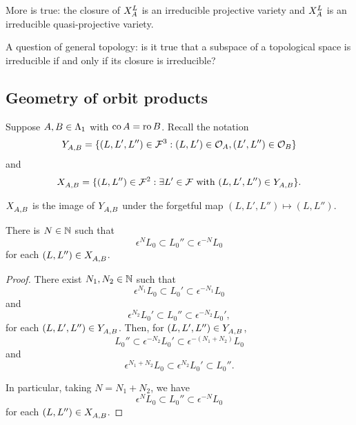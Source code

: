 \documentclass[a4paper, 11pt]{report}
\begin{document}
\begin{remark}
More is true: the closure of $\xprod[L]{A}$ is an irreducible projective variety and $\xprod[L]{A}$ is an irreducible quasi-projective variety.
\end{remark}

\begin{remark}
A question of general topology: is it true that a subspace of a topological space is irreducible if and only if its closure is irreducible?
\end{remark}


\subsection{Geometry of orbit products}

Suppose $A,B\in\matrices$ with $\co{A}=\ro{B}$. Recall the notation
\begin{equation*}
\yprod{A,B} = \{(L,L',L'')\in\flags^3: (L,L')\in\orbit{A}, (L',L'')\in\orbit{B}\}
\end{equation*}
and
\begin{equation*}
\xprod{A,B} = \{(L,L'')\in\flags^2:\exists L'\in\flags \text{ with } (L,L',L'')\in \yprod{A,B}\}.
\end{equation*}

$\xprod{A,B}$ is the image of $\yprod{A,B}$ under the forgetful map $(L,L',L'')\mapsto (L,L'')$.

\begin{lemma}\label{lemma:orbit-products-are-bounded}
There is $N\in\naturals$ such that
\begin{equation*}
\epsilon^N L_0\subset L_0''\subset \epsilon^{-N}L_0
\end{equation*}
for each $(L,L'')\in \xprod{A,B}$.
\end{lemma}

\begin{proof}
There exist $N_1,N_2\in\naturals$ such that
\begin{equation*}
\epsilon^{N_1}L_0\subset L_0'\subset \epsilon^{-N_1}L_0
\end{equation*}
and
\begin{equation*}
\epsilon^{N_2}L_0'\subset L_0''\subset \epsilon^{-N_2}L_0',
\end{equation*}
for each $(L,L',L'')\in \yprod{A,B}$. Then, for $(L,L',L'')\in \yprod{A,B}$,
\begin{equation*}
L_0''\subset \epsilon^{-N_2} L_0' \subset \epsilon^{-(N_1+N_2)} L_0
\end{equation*}
and
\begin{equation*}
\epsilon^{N_1+N_2}L_0\subset \epsilon^{N_2}L_0'\subset L_0''.
\end{equation*}

In particular, taking $N=N_1 + N_2$, we have
\begin{equation*}
\epsilon^N L_0 \subset L_0'' \subset \epsilon^{-N}L_0
\end{equation*}
for each $(L,L'')\in \xprod{A,B}$.
\end{proof}
\end{document}
